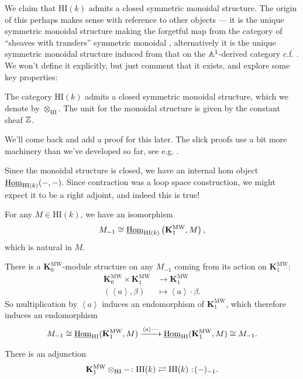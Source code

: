 \documentclass[11pt,openany]{book}
\providecommand{\HI}{\mathrm{HI}}
\providecommand{\KMW}{\mathbf{K}^\mathrm{MW}}
\begin{document}
We claim that $\HI(k)$ admits a closed symmetric monoidal structure. The origin of this perhaps makes sense with reference to other objects --- it is the unique symmetric monoidal structure making the forgetful map from the category of ``sheaves with transfers'' symmetric monoidal \cite[Lemme~1.8]{Deglise-MH}, alternatively it is the unique symmetric monoidal structure induced from that on the $\mathbb{A}^1$-derived category c.f. \cite[1.5.1.20]{Feld-thesis}. We won't define it explicitly, but just comment that it exists, and explore some key properties:

\begin{theorem} The category $\HI(k)$ admits a closed symmetric monoidal structure, which we denote by $\otimes_\HI$. The unit for the monoidal structure is given by the constant sheaf $\mathbb{Z}$. 
\end{theorem}
We'll come back and add a proof for this later. The slick proofs use a bit more machinery than we've developed so far, see e.g. \cite[4.2.1.20]{Feld-thesis}.

Since the monoidal structure is closed, we have an internal hom object $\underline{\Hom}_{\HI(k)}(-,-)$. Since contraction was a loop space construction, we might expect it to be a right adjoint, and indeed this is true!

\begin{proposition} For any $M \in \HI(k)$, we have an isomorphism
\begin{align*}
    M_{-1} \cong \underline{\Hom}_{\HI(k)} \left( \KMW_1, M \right),
\end{align*}
which is natural in $M$.
\end{proposition}

There is a $\KMW_0$-module structure on any $M_{-1}$ coming from its action on $\KMW_1$:
\begin{align*}
    \KMW_0 \times \KMW_1 &\to \KMW_1 \\
    (\left\langle a \right\rangle, \beta) &\mapsto \left\langle a \right\rangle\cdot \beta.
\end{align*}
So multiplication by $\left\langle a \right\rangle$ induces an endomorphism of $\KMW_1$, which therefore induces an endomorphism
\begin{align*}
    M_{-1} \cong \underline{\Hom}_\HI (\KMW_1,M) \xto{\left\langle a \right\rangle\cdot -} \underline{\Hom}_\HI(\KMW_1,M) \cong M_{-1}.
\end{align*}
%



\begin{corollary} There is an adjunction
\begin{align*}
    \KMW_1 \otimes_\HI - \colon \HI(k) \rightleftarrows \HI(k) \noloc (-)_{-1}.
\end{align*}
\end{corollary}
\end{document}
